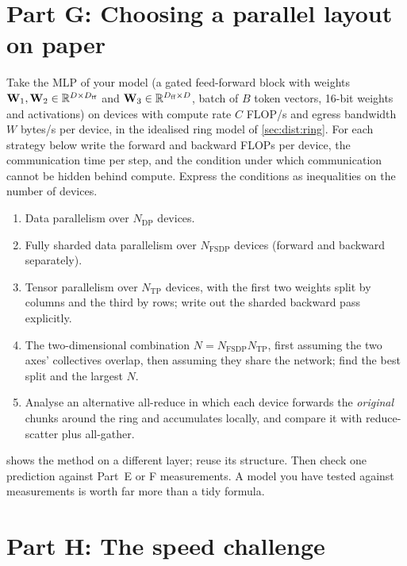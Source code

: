 \section{Part G: Choosing a parallel layout on paper}\label{sec:proj2:g}

Take the MLP of your model (a gated feed-forward block with weights $\mathbf{W}_1,\mathbf{W}_2\in\mathbb{R}^{D\times
D_{\text{ff}}}$ and $\mathbf{W}_3\in\mathbb{R}^{D_{\text{ff}}\times D}$, batch of $B$ token vectors, 16-bit weights
and activations) on devices with compute rate $C$ FLOP/s and egress bandwidth $W$ bytes/s per device,
in the idealised ring model of \cref{sec:dist:ring}. For each strategy below write the forward and
backward FLOPs per device, the communication time per step, and the condition under which
communication cannot be hidden behind compute. Express the conditions as inequalities on the number
of devices.
\begin{enumerate}
\item Data parallelism over $N_{\text{DP}}$ devices.
\item Fully sharded data parallelism over $N_{\text{FSDP}}$ devices (forward and backward separately).
\item Tensor parallelism over $N_{\text{TP}}$ devices, with the first two weights split by columns and
  the third by rows; write out the sharded backward pass explicitly.
\item The two-dimensional combination $N=N_{\text{FSDP}}N_{\text{TP}}$, first assuming the two axes'
  collectives overlap, then assuming they share the network; find the best split and the largest $N$.
\item Analyse an alternative all-reduce in which each device forwards the \emph{original} chunks
  around the ring and accumulates locally, and compare it with reduce-scatter plus all-gather.
\end{enumerate}
 shows the method on a different layer; reuse its structure. Then
check one prediction against Part~E or F measurements. A model you have tested against
measurements is worth far more than a tidy formula.

\section{Part H: The speed challenge}\label{sec:proj2:h}

